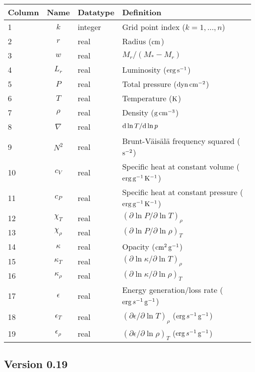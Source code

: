 \documentclass{article}
\newcommand{\diff}{\ensuremath{{\rm d}}}
\newcommand{\Mstar}{\ensuremath{M_{\ast}}}
\newcommand{\cm}{\ensuremath{{\rm cm}}}
\newcommand{\gram}{\ensuremath{{\rm g}}}
\newcommand{\second}{\ensuremath{{\rm s}}}
\newcommand{\dyne}{\ensuremath{{\rm dyn}}}
\newcommand{\erg}{\ensuremath{{\rm erg}}}
\newcommand{\kelvin}{\ensuremath{{\rm K}}}
\begin{document}
\begin{table}[h!]
\begin{tabular}{|l|c|l|l|} \hline
Column & Name & Datatype & Definition \\ \hline
1      & $k$ & integer & Grid point index ($k=1,\ldots,n$) \\
2      & $r$ & real    & Radius ($\cm$) \\
3      & $w$ & real    & $M_{r}/(\Mstar-M_{r})$ \\
4      & $L_{r}$ & real & Luminosity ($\erg\,\second^{-1}$) \\
5      & $P$ & real    & Total pressure ($\dyne\,\cm^{-2}$) \\
6      & $T$ & real    & Temperature ($\kelvin$) \\
7      & $\rho$ & real & Density ($\gram\,\cm^{-3}$) \\
8      & $\nabla$ & real & $\diff \ln T/\diff \ln p$ \\
9      & $N^{2}$ & real & Brunt-V\"ais\"al\"a frequency squared ($\second^{-2}$) \\
10      & $c_{V}$ & real & Specific heat at constant volume ($\erg\,\gram^{-1}\,\kelvin^{-1}$) \\
11     & $c_{P}$ & real & Specific heat at constant pressure ($\erg\,\gram^{-1}\,\kelvin^{-1}$) \\
12     & $\chi_{T}$ & real & $(\partial \ln P/\partial \ln T)_{\rho} $ \\
13     & $\chi_{\rho}$ & real & $(\partial \ln P/\partial \ln \rho)_{T} $ \\
14     & $\kappa$ & real & Opacity ($\cm^{2}\,\gram^{-1}$) \\
15     & $\kappa_{T}$ & real & $(\partial \ln \kappa/\partial \ln T)_{\rho}$ \\
16     & $\kappa_{\rho}$ & real & $(\partial \ln \kappa/\partial \ln \rho)_{T}$ \\
17     & $\epsilon$ & real & Energy generation/loss rate ($\erg\,s^{-1}\,\gram^{-1}$) \\
18     & $\epsilon_{T}$ & real & $(\partial \epsilon/\partial \ln T)_{\rho}$ ($\erg\,s^{-1}\,\gram^{-1}$) \\
19     & $\epsilon_{\rho}$ & real & $(\partial \epsilon/\partial \ln \rho)_{T}$ ($\erg\,s^{-1}\,\gram^{-1}$) \\ \hline
\end{tabular}
\end{table}

\subsection*{Version 0.19}
\end{document}
